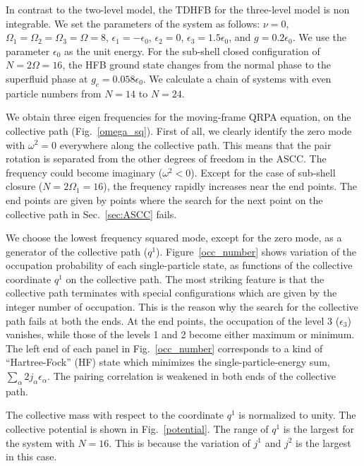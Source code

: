 \documentclass[11pt]{book} %
\begin{document}
In contrast to the two-level model,
the TDHFB for the three-level model is non integrable.
We set the parameters of the system as follows: $\nu=0$,
$\Omega_1=\Omega_2=\Omega_3=\Omega=8$,
$\epsilon_1=-\epsilon_0$, $\epsilon_2=0$, $\epsilon_3=1.5\epsilon_0$,
and $g=0.2\epsilon_0$.
We use the parameter $\epsilon_0$ as the unit energy.
For the sub-shell closed configuration of $N=2\Omega=16$,
the HFB ground state changes from the normal phase to
the superfluid phase at $g_c=0.058\epsilon_0$.
We calculate a chain of systems with even particle numbers
from $N=14$ to $N=24$. 

We obtain three eigen frequencies for the moving-frame QRPA equation, 
on the collective path (Fig.~\ref{omega_sq}). 
First of all, we clearly identify the zero mode with $\omega^2=0$
everywhere along the collective path.
This means that the pair rotation is separated from the other
degrees of freedom in the ASCC.
The frequency could become imaginary ($\omega^2<0$).
Except for the case of sub-shell closure ($N=2\Omega_1=16$),
the frequency rapidly increases near the end points.
The end points are given by points where the search for the next point
on the collective path in Sec.~\ref{sec:ASCC} fails.

We choose the lowest frequency squared mode, except for the zero mode,
as a generator of the collective path ($q^1$).
Figure~\ref{occ_number} shows variation of the occupation probability
of each single-particle state, as functions of the collective
coordinate $q^1$ on the collective path.
The most striking feature is that the collective path terminates
with special configurations which are given by the integer number
of occupation.
This is the reason why the search for the collective path fails
at both the ends.
At the end points,
the occupation of the level 3 ($\epsilon_3$) vanishes, while
those of the levels 1 and 2 become either maximum or minimum.
The left end of each panel in Fig.~\ref{occ_number} corresponds to 
a kind of ``Hartree-Fock'' (HF) state which minimizes
the single-particle-energy sum, $\sum_\alpha 2j_\alpha \epsilon_\alpha$.
The pairing correlation is weakened in both ends of the
collective path.

The collective mass with respect to the coordinate $q^1$ is normalized
to unity.
The collective potential is shown in Fig.~\ref{potential}.
The range of $q^1$ is the largest for the system with $N=16$.
This is because the variation of $j^1$ and $j^2$ is the largest in
this case.
\end{document}
